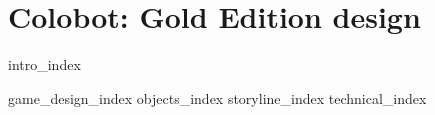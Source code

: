 
\part{Colobot: Gold Edition design}

{intro_index}

{game_design_index}
{objects_index}
{storyline_index}
{technical_index}
